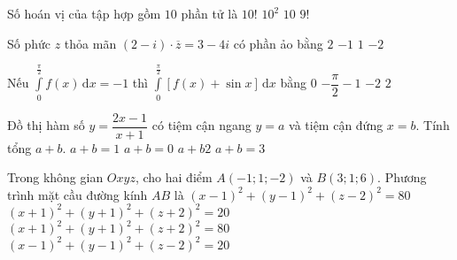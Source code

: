 \begin{ex}%
	Số hoán vị của tập hợp gồm $10$ phần tử là 
	\choice
	{\True $10!$}
	{$10^2$}
	{$10$}
	{$9!$}
\end{ex}
\begin{ex}%
	Số phức $z$ thỏa mãn $(2-i)\cdot \overline{z}=3-4i$ có phần ảo bằng
	\choice
	{$2$}
	{$-1$}
	{\True $1$}
	{$-2$}
\end{ex}
\begin{ex}%
	Nếu $\displaystyle\int\limits_0^{\frac{\pi}{2}} f(x) \mathrm{\,d}x=-1$ thì $\displaystyle\int\limits_0^{\frac{\pi}{2}} \left[f(x)+\sin x\right] \mathrm{\,d}x$ bằng
	\choice
	{\True $0$}
	{$-\dfrac{\pi}{2}-1$}
	{$-2$}
	{$2$}
\end{ex}
\begin{ex}%
	Đồ thị hàm số $y=\dfrac{2x-1}{x+1}$ có tiệm cận ngang $y=a$ và tiệm cận đứng $x=b$. Tính tổng $a+b$.
	\choice
	{\True $a+b=1$}
	{$a+b=0$}
	{$a+b2$}
	{$a+b=3$}
\end{ex}
\begin{ex}%
	Trong không gian $Oxyz$, cho hai điểm $A(-1;1;-2)$ và $B(3;1;6)$. Phương trình mặt cầu đường kính $AB$ là 
	\choice
	{$(x-1)^2+(y-1)^2+(z-2)^2=80$}
	{$(x+1)^2+(y+1)^2+(z+2)^2=20$}
	{$(x+1)^2+(y+1)^2+(z+2)^2=80$}
	{\True $(x-1)^2+(y-1)^2+(z-2)^2=20$}
\end{ex}


